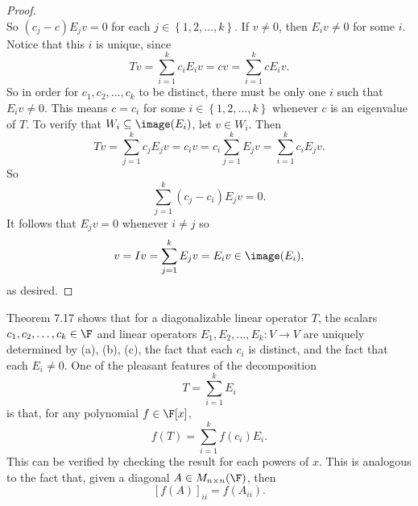 \documentclass[linearalgebra]{subfiles}
\begin{document}
\begin{proof}
\begin{equation*}
        \end{equation*}
        So $(c_j-c)E_jv = 0$ for each $j\in \left\lbrace 1, 2, \ldots, k \right\rbrace$. If $v\neq 0$, then $E_iv\neq 0$ for some $i$. Notice that this $i$ is unique, since
        \begin{equation*}
            Tv = \sum^{k}_{i=1} c_iE_iv = cv = \sum^{k}_{i=1} cE_iv.
        \end{equation*}
        So in order for $c_1, c_2, \ldots, c_k$ to be distinct, there must be only one $i$ such that $E_iv\neq 0$. This means $c = c_i$ for some $i\in \left\lbrace 1, 2, \ldots, k \right\rbrace$ whenever $c$ is an eigenvalue of $T$. To verify that $W_i\subseteq \image(E_i)$, let $v\in W_i$. Then
        \begin{equation*}
            Tv = \sum^{k}_{j=1} c_jE_jv = c_iv = c_i \sum^{k}_{j=1} E_jv = \sum^{k}_{i=1} c_iE_jv.
        \end{equation*}
        So
        \begin{equation*}
            \sum^{k}_{j=1} \left( c_j - c_i \right) E_jv = 0. 
        \end{equation*}
        It follows that $E_jv = 0$ whenever $i\neq j$ so
        \begin{equation*}
            v = Iv = \sum^{k}_{j=1} E_jv = E_iv \in \image(E_i),
        \end{equation*}
        as desired.
    \end{proof}

    \begin{remark}
        Theorem 7.17 shows that for a diagonalizable linear operator $T$, the scalars $c_1, c_2, \ldots, c_k\in \F$ and linear operators $E_1, E_2, \ldots, E_k:V\to V$ are uniquely determined by (a), (b), (c), the fact that each $c_i$ is distinct, and the fact that each $E_i\neq 0$. One of the pleasant features of the decomposition
        \begin{equation*}
            T = \sum^{k}_{i=1} E_i
        \end{equation*}
        is that, for any polynomial $f\in \F[x]$,
        \begin{equation*}
            f(T) = \sum^{k}_{i=1} f(c_i)E_i.
        \end{equation*}
        This can be verified by checking the result for each powers of $x$. This is analogous to the fact that, given a diagonal $A\in M_{n\times n}(\F)$, then
        \begin{equation*}
            \left[ f(A) \right] _{ii} = f(A_{ii}).
        \end{equation*}
    \end{remark}
\end{document}
